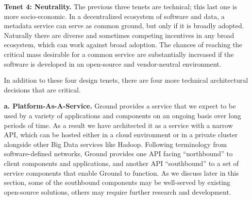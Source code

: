 \documentclass[10pt,letterpaper]{article}
\begin{document}
\vspace{0.5em}\noindent
\textbf{Tenet 4: Neutrality.}  The previous three tenets are technical; this last one is more socio-economic.  In a decentralized ecosystem of software and data, a metadata service can serve as common ground, but only if it is broadly adopted.  Naturally there are diverse and sometimes competing incentives in any broad ecosystem, which can work against broad adoption.  The chances of reaching the critical mass desirable for a common service are substantially increased if the software is developed in an open-source and vendor-neutral environment.  


In addition to these four design tenets, there are four more technical architectural decisions that are critical.

\vspace{0.5em}\noindent
\textbf{a. Platform-As-A-Service.}  Ground provides a service that we expect to be used by a variety of applications and components on an ongoing basis over long periods of time.  As a result we have architected it as a service with a narrow API, which can be hosted either in a cloud environment or in a private cluster alongside other Big Data services like Hadoop. Following terminology from software-defined networks, Ground provides one API facing ``northbound'' to client components and applications, and another API ``southbound'' to a set of service components that enable Ground to function.  As we discuss later in this section, some of the southbound components may be well-served by existing open-source solutions, others may require further research and development.
\end{document}
